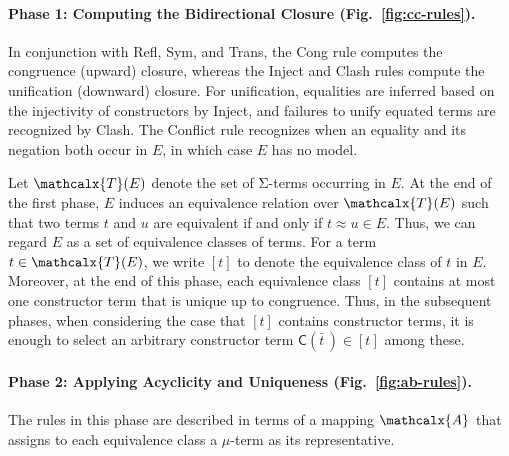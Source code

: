 \documentclass[smallcondensed,draft]{svjour3}
\newcommand\Sig{\mathrm{\Sigma}}
\newcommand\const[1]{\textsf{#1}}
\renewcommand{\vec}[1]{\bar #1}
\newcommand{\Ec}{E}
\newcommand{\tEc}{\Terms(\Ec)}
\newcommand{\rn}[1]{\textsf{#1}}
\newcommand{\teq}{\approx}
\newcommand{\ec}[1]{[#1]}
\newcommand{\Val}{\mathcalx{A}\vvthinspace}
\newcommand\Terms{\mathcalx{T}}
\newcommand\vvthinspace{\kern+0.041667em}
\begin{document}
\paragraph{Phase 1: Computing the Bidirectional Closure \rm(Fig.~\ref{fig:cc-rules}).}
In conjunction with \rn{Refl}, \rn{Sym}, and \rn{Trans}, the \rn{Cong} rule computes the congruence (upward) closure,
whereas the \rn{Inject} and \rn{Clash} rules %
compute the unification (downward) closure.
For unification, %
equalities are inferred based on the injectivity of constructors by \rn{Inject},
and failures to unify equated terms are recognized by \rn{Clash}.
The \rn{Conflict} rule recognizes when an equality and its negation both occur in $\Ec$, in which case $\Ec$ has no model.

Let $\tEc$ denote the set of $\Sig$-terms occurring in $\Ec$.
At the end of the first phase, $\Ec$ induces an equivalence
relation over $\tEc$ such that two terms $t$ and $u$ are equivalent if and
only if $t \teq u \in \Ec$.
Thus, we can regard $\Ec$ as a set of
equivalence classes of terms. For a term $t \in \tEc$, we write $\ec{t}$ to
denote the equivalence class of $t$ in $\Ec$.
Moreover, at the end of this phase, each equivalence class $\ec{t}$ contains
at most %
one constructor term that is unique up to congruence.
Thus, in the subsequent phases, 
when considering the case that $\ec{t}$ contains constructor terms,
it is enough %
to select an arbitrary constructor term $\const{C}( \vec t\, ) \in \ec{t}$ among these.

\paragraph{Phase 2: Applying Acyclicity and Uniqueness \rm(Fig.~\ref{fig:ab-rules}).}
The rules in this phase are described in terms of a mapping $\Val$
that assigns to each equivalence class a $\mu$-term as its representative.
\end{document}
